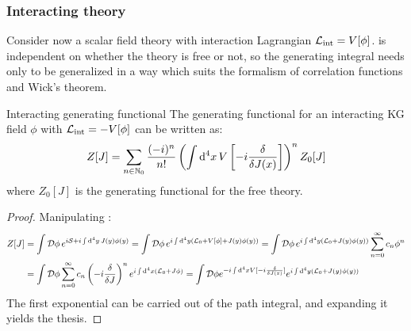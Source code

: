 \subsubsection{Interacting theory}

Consider now a scalar field theory with interaction Lagrangian $ \mathcal{L}_\text{int} = V[\phi] $.  is independent on whether the theory is free or not, so the generating integral needs only to be generalized in a way which suits the formalism of correlation functions and Wick's theorem.

\begin{proposition}{Interacting generating functional}{}
  The generating functional for an interacting KG field $ \phi $ with $ \mathcal{L}_\text{int} = - V[\phi] $ can be written as:
  \begin{equation}
    Z[J] = \sum_{n \in \mathbb{N}_0} \frac{(-i)^n}{n!} \left( \int \mathrm{d}^4x\, V \left[ -i \frac{\delta}{\delta J(x)} \right] \right)^n Z_0[J]
  \end{equation}
  where $ Z_0[J] $ is the generating functional for the free theory.
\end{proposition}

\begin{proofbox}
  \begin{proof}
    Manipulating :
    \begin{equation*}
      \begin{split}
        Z[J]
        & = \int \mathcal{D}\phi\, e^{i\mathcal{S} + i \int \mathrm{d}^4y\, J(y) \phi(y)} = \int \mathcal{D}\phi\, e^{i \int \mathrm{d}^4y \left( \mathcal{L}_0 + V[\phi] + J(y) \phi(y) \right)} = \int \mathcal{D}\phi\, e^{i \int \mathrm{d}^4y \left( \mathcal{L}_0 + J(y) \phi(y) \right)} \sum_{n = 0}^\infty c_n \phi^n \\
        & = \int \mathcal{D}\phi \sum_{n = 0}^\infty c_n \left( -i \frac{\delta}{\delta J} \right)^n e^{i \int \mathrm{d}^4x \left( \mathcal{L}_0 + J \phi \right)} = \int \mathcal{D} \phi e^{-i \int \mathrm{d}^4x V[-i \frac{\delta}{\delta J(x)}]} e^{i \int \mathrm{d}^4y \left( \mathcal{L}_0 + J(y) \phi(y) \right)}
      \end{split}
    \end{equation*}
    The first exponential can be carried out of the path integral, and expanding it yields the thesis.
  \end{proof}
\end{proofbox}

